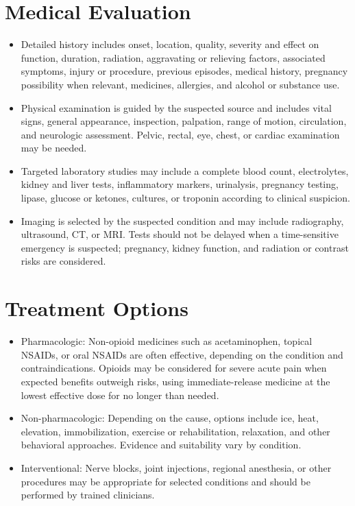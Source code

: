 \section*{Medical Evaluation}
\begin{itemize}
 \item Detailed history includes onset, location, quality, severity and effect on function, duration, radiation, aggravating or relieving factors, associated symptoms, injury or procedure, previous episodes, medical history, pregnancy possibility when relevant, medicines, allergies, and alcohol or substance use.
 \item Physical examination is guided by the suspected source and includes vital signs, general appearance, inspection, palpation, range of motion, circulation, and neurologic assessment. Pelvic, rectal, eye, chest, or cardiac examination may be needed.
 \item Targeted laboratory studies may include a complete blood count, electrolytes, kidney and liver tests, inflammatory markers, urinalysis, pregnancy testing, lipase, glucose or ketones, cultures, or troponin according to clinical suspicion.
 \item Imaging is selected by the suspected condition and may include radiography, ultrasound, CT, or MRI. Tests should not be delayed when a time-sensitive emergency is suspected; pregnancy, kidney function, and radiation or contrast risks are considered.
\end{itemize}

\section*{Treatment Options}
\begin{itemize}
 \item Pharmacologic: Non-opioid medicines such as acetaminophen, topical NSAIDs, or oral NSAIDs are often effective, depending on the condition and contraindications. Opioids may be considered for severe acute pain when expected benefits outweigh risks, using immediate-release medicine at the lowest effective dose for no longer than needed.
 \item Non-pharmacologic: Depending on the cause, options include ice, heat, elevation, immobilization, exercise or rehabilitation, relaxation, and other behavioral approaches. Evidence and suitability vary by condition.
 \item Interventional: Nerve blocks, joint injections, regional anesthesia, or other procedures may be appropriate for selected conditions and should be performed by trained clinicians.
\end{itemize}

